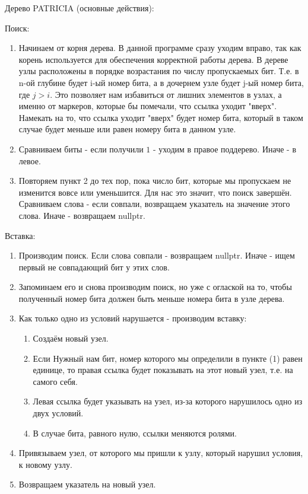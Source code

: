 \documentclass[12pt]{article}
\begin{document}
Дерево PATRICIA (основные действия):

Поиск:
\begin{enumerate}
	\item Начинаем от корня дерева. В данной программе сразу уходим вправо, так как корень используется для обеспечения корректной работы дерева. В дереве узлы расположены в порядке возрастания по числу пропускаемых бит. Т.е. в n-ой глубине будет i-ый номер бита, а в дочернем узле будет j-ый номер бита, где $j > i$. Это позволяет нам избавиться от лишних элементов в узлах, а именно от маркеров, которые бы помечали, что ссылка уходит "вверх". Намекать на то, что ссылка уходит "вверх" будет номер бита, который в таком случае будет меньше или равен номеру бита в данном узле.
	\item Сравниваем биты - если получили $1$ - уходим в правое поддерево. Иначе - в левое.
	\item Повторяем пункт 2 до тех пор, пока число бит, которые мы пропускаем не изменится вовсе или уменьшится. Для нас это значит, что поиск завершён. Сравниваем слова - если совпали, возвращаем указатель на значение этого слова. Иначе - возвращаем nullptr.
\end{enumerate}

Вставка:
\begin{enumerate}
	\item Производим поиск. Если слова совпали - возвращаем nullptr. Иначе - ищем первый не совпадающий бит у этих слов.
	\item Запоминаем его и снова производим поиск, но уже с оглаской на то, чтобы полученный номер бита должен быть меньше номера бита в узле дерева.
	\item Как только одно из условий нарушается - производим вставку:
	\begin{enumerate}
		\item Создаём новый узел. 
		\item Если Нужный нам бит, номер которого мы определили в пункте (1) равен единице, то правая ссылка будет показывать на этот новый узел, т.е. на самого себя. 
		\item Левая ссылка будет указывать на узел, из-за которого нарушилось одно из двух условий.
		\item В случае бита, равного нулю, ссылки меняются ролями.
	\end{enumerate}
	\item Привязываем узел, от которого мы пришли к узлу, который нарушил условия, к новому узлу.
	\item Возвращаем указатель на новый узел.
\end{enumerate}
\end{document}

